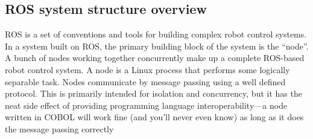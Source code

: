 \subsection{ROS system structure overview}
ROS is a set of conventions and tools for building complex robot control systems.
In a system built on ROS, the primary building block of the system is the “node”.
A bunch of nodes working together concurrently make up a complete ROS-based
robot control system.
A node is a Linux process that performs some logically separable task. Nodes
communicate by message passing using a well defined protocol. This is primarily
intended for isolation and concurrency, but it has the neat side effect of
providing programming language interoperability—a node written in COBOL will
work fine (and you'll never even know) as long as it does the message passing
correctly


